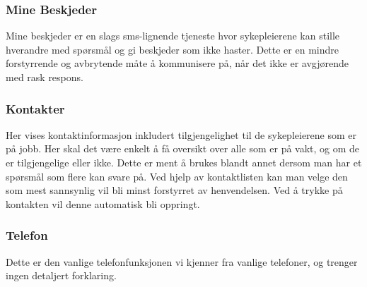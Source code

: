 \subsubsection{Mine Beskjeder}
Mine beskjeder er en slags sms-lignende tjeneste hvor sykepleierene kan stille hverandre med spørsmål og gi beskjeder som ikke haster. Dette er en mindre forstyrrende og avbrytende måte å kommunisere på, når det ikke er avgjørende med rask respons.

\subsubsection{Kontakter}
Her vises kontaktinformasjon inkludert tilgjengelighet til de sykepleierene som er på jobb. Her skal det være enkelt å få oversikt over alle som er på vakt, og om de er tilgjengelige eller ikke. Dette er ment å brukes blandt annet dersom man har et spørsmål som flere kan svare på. Ved hjelp av kontaktlisten kan man velge den som mest sannsynlig vil bli minst forstyrret av henvendelsen. Ved å trykke på kontakten vil denne automatisk bli oppringt.

\subsubsection{Telefon}
Dette er den vanlige telefonfunksjonen vi kjenner fra vanlige telefoner, og trenger ingen detaljert forklaring.



